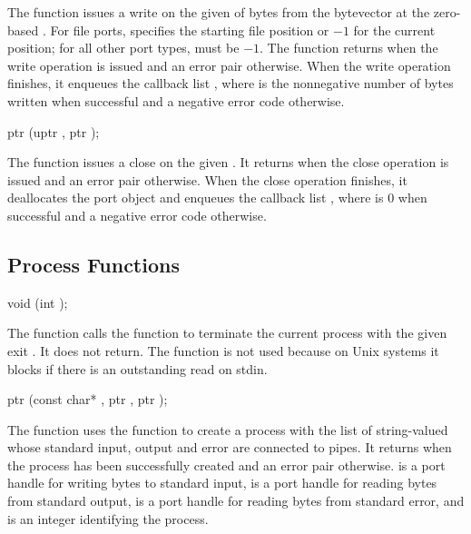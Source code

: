 The  function issues a write on the given
 of  bytes from the bytevector  at the
zero-based . For file ports,  specifies
the starting file position or $-1$ for the current position; for all
other port types,  must be $-1$.  The function returns
 when the write operation is issued and an error pair
otherwise. When the write operation finishes, it enqueues the callback
list , where  is the
nonnegative number of bytes written when successful and a negative
error code otherwise.

\begin{function}
  ptr (uptr , ptr );
\end{function}

The  function issues a close on the given
. It returns  when the close operation is issued
and an error pair otherwise. When the close operation finishes, it
deallocates the port object and enqueues the callback list
, where  is 0 when
successful and a negative error code otherwise.

\subsection {Process Functions}

\begin{function}
  void (int );
\end{function}

The  function calls the  function to
terminate the current process with the given exit . It
does not return. The  function is not used because on Unix
systems it blocks if there is an outstanding read on stdin.

\begin{function}
  ptr (const char* , ptr , ptr );
\end{function}

The  function uses the  function to
create a process with the list of string-valued  whose
standard input, output and error are connected to pipes.  It returns
 when the process has been successfully created and an
error pair otherwise.   is a port handle for writing
bytes to standard input,  is a port handle for
reading bytes from standard output,  is a port handle
for reading bytes from standard error, and  is an integer
identifying the process.

